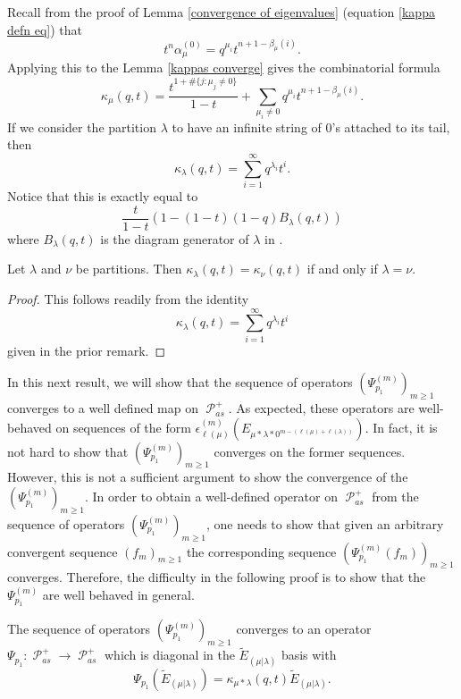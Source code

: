 \documentclass[ALCO,Unicode]{cedram}
\DeclareMathOperator{\sP}{\mathscr{P} }
\begin{document}
\begin{rema}
    Recall from the proof of Lemma \ref{convergence of eigenvalues} (equation \eqref{kappa defn eq}) that 
    $$t^n\alpha_{\mu}^{(0)} = q^{\mu_i}t^{n+1-\beta_{\mu}(i)}.$$ Applying this to the Lemma \ref{kappas converge} gives the combinatorial formula 
    $$\kappa_{\mu}(q,t) = \frac{t^{1+\#\{j:\mu_j \neq 0\}}}{1-t}+ \sum_{\mu_i \neq 0} q^{\mu_i}t^{n+1- \beta_{\mu}(i)}.$$ If we consider the partition $\lambda$ to have an infinite string of $0$'s attached to its tail, then 
    $$\kappa_{\lambda}(q,t) = \sum_{i=1}^{\infty} q^{\lambda_i}t^{i}.$$ Notice that this is exactly equal to 
    $$\frac{t}{1-t}\left(1 - (1-t)(1-q)B_{\lambda}(q,t) \right)$$ where $B_{\lambda}(q,t)$ is the diagram generator of $\lambda$ in \cite[Section 2, (2.12), page 7]{HMacDG}.
\end{rema}

\begin{coro}
    Let $\lambda$ and $\nu$ be partitions. Then $\kappa_{\lambda}(q,t) = \kappa_{\nu}(q,t)$ if and only if $\lambda = \nu$.
\end{coro}
\begin{proof}
    This follows readily from the identity 
    $$\kappa_{\lambda}(q,t) =  \sum_{i=1}^{\infty} q^{\lambda_i}t^{i}$$ given in the prior remark. 
\end{proof}

In this next result, we will show that the sequence of operators $(\Psi_{p_1}^{(m)})_{m\geq 1}$ converges to a well defined map on $\sP_{as}^{+}$. As expected, these operators are well-behaved on sequences of the form $\epsilon_{\ell(\mu)}^{(m)}(E_{\mu*\lambda*0^{m-(\ell(\mu)+\ell(\lambda))}}).$ In fact, it is not hard to show that $(\Psi_{p_1}^{(m)})_{m\geq 1}$ converges on the former sequences. However, this is not a sufficient argument to show the convergence of the $(\Psi_{p_1}^{(m)})_{m\geq 1}$. In order to obtain a well-defined operator on $\sP_{as}^{+}$ from the sequence of operators $(\Psi_{p_1}^{(m)})_{m\geq 1}$, one needs to show that given an arbitrary convergent sequence $(f_m)_{m\geq 1}$ the corresponding sequence $(\Psi_{p_1}^{(m)}(f_m))_{m\geq 1}$ converges. Therefore, the difficulty in the following proof is to show that the $\Psi_{p_1}^{(m)}$ are well behaved in general.


\begin{thm}\label{psi 1 converges}
    The sequence of operators $(\Psi_{p_1}^{(m)})_{m\geq 1}$ converges to an operator $\Psi_{p_1}: \sP_{as}^{+}\rightarrow \sP_{as}^{+}$ which is diagonal in the $\widetilde{E}_{(\mu|\lambda)}$ basis with 
    \begin{equation}
        \Psi_{p_1}(\widetilde{E}_{(\mu|\lambda)}) = \kappa_{\mu*\lambda}(q,t) \widetilde{E}_{(\mu|\lambda)}.
    \end{equation}
    
\end{thm}
\end{document}

